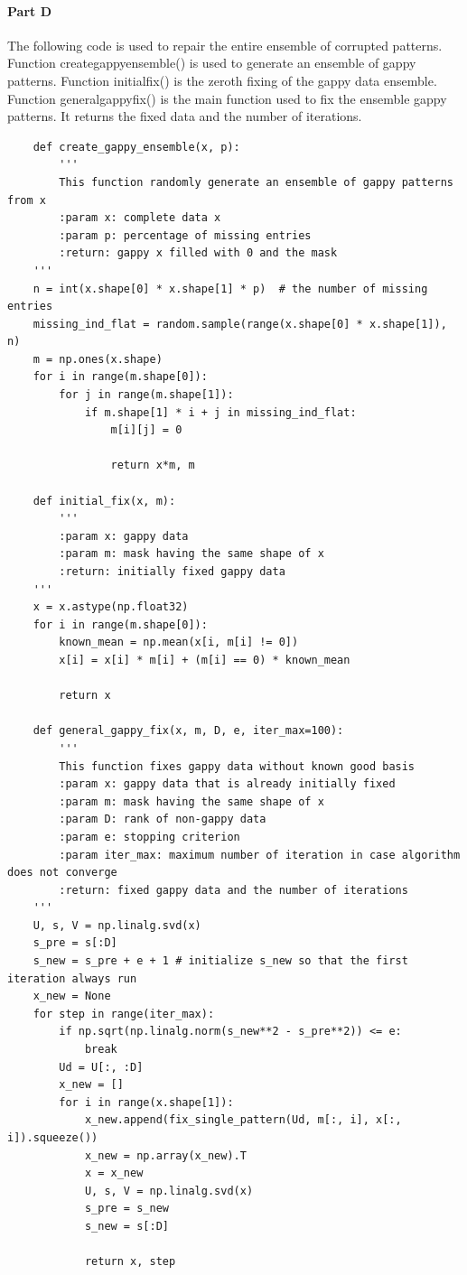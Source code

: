 \documentclass{article}
\begin{document}
\paragraph{Part D} The following code is used to repair the entire ensemble of corrupted patterns. Function create\textunderscore gappy\textunderscore ensemble() is used to generate an ensemble of gappy patterns. Function initial\textunderscore fix() is the zeroth fixing of the gappy data ensemble. Function general\textunderscore gappy\textunderscore fix() is the main function used to fix the ensemble gappy patterns. It returns the fixed data and the number of iterations. 
\begin{lstlisting}
	def create_gappy_ensemble(x, p):
		'''
		This function randomly generate an ensemble of gappy patterns from x
		:param x: complete data x
		:param p: percentage of missing entries
		:return: gappy x filled with 0 and the mask
	'''
	n = int(x.shape[0] * x.shape[1] * p)  # the number of missing entries
	missing_ind_flat = random.sample(range(x.shape[0] * x.shape[1]), n)
	m = np.ones(x.shape)
	for i in range(m.shape[0]):
		for j in range(m.shape[1]):
			if m.shape[1] * i + j in missing_ind_flat:
				m[i][j] = 0
				
				return x*m, m
			
	def initial_fix(x, m):
		'''
		:param x: gappy data
		:param m: mask having the same shape of x
		:return: initially fixed gappy data
	'''
	x = x.astype(np.float32)
	for i in range(m.shape[0]):
		known_mean = np.mean(x[i, m[i] != 0])
		x[i] = x[i] * m[i] + (m[i] == 0) * known_mean
		
		return x

	def general_gappy_fix(x, m, D, e, iter_max=100):
		'''
		This function fixes gappy data without known good basis
		:param x: gappy data that is already initially fixed
		:param m: mask having the same shape of x
		:param D: rank of non-gappy data
		:param e: stopping criterion
		:param iter_max: maximum number of iteration in case algorithm does not converge
		:return: fixed gappy data and the number of iterations
	'''
	U, s, V = np.linalg.svd(x)
	s_pre = s[:D]
	s_new = s_pre + e + 1 # initialize s_new so that the first iteration always run
	x_new = None
	for step in range(iter_max):
		if np.sqrt(np.linalg.norm(s_new**2 - s_pre**2)) <= e:
			break
		Ud = U[:, :D]
		x_new = []
		for i in range(x.shape[1]):
			x_new.append(fix_single_pattern(Ud, m[:, i], x[:, i]).squeeze())
			x_new = np.array(x_new).T
			x = x_new
			U, s, V = np.linalg.svd(x)
			s_pre = s_new
			s_new = s[:D]
			
			return x, step
\end{lstlisting}
\end{document}
